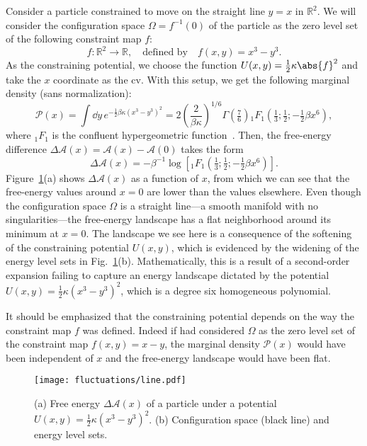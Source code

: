 Consider a particle constrained to move on the straight line $y = x$ in $\mathbb{R}^{2}$.
We will consider the configuration space $\Omega = f^{-1}(0)$ of the particle as the zero level set of the following constraint map $f$:
%
\begin{equation}
  f: \mathbb{R}^{2} \to \mathbb{R},
  \quad\text{defined by}\quad
  f(x, y) = x^{3} - y^{3}.
\end{equation}
%
As the constraining potential, we choose the function $U(x, y) = \tfrac{1}{2}\kappa\abs{f}^{2}$ and take the $x$ coordinate as the \ac{cv}.
With this setup, we get the following marginal density (sans normalization):
%
\begin{equation}
  \mathscr{P}(x) = \int \dd{y}\,e^{-\tfrac{1}{2}\beta\kappa (x^{3}-y^{3})^{2}}= 2\left(\frac{2}{\beta\kappa}\right)^{1/6}\Gamma\left(\tfrac{7}{6}\right){}_{1}\!F_{1}\left(\tfrac{1}{3};\tfrac{1}{2};-\tfrac{1}{2}\beta x^{6}\right),
\end{equation}
%
where ${}_{1}\!F_{1}$ is the confluent hypergeometric function~\cite{olver2010}.
Then, the free-energy difference $\Delta\mathscr{A}(x) = \mathscr{A}(x) - \mathscr{A}(0)$ takes the form
%
\begin{equation}
  \Delta\mathscr{A}(x) = -\beta^{-1}\log\left[{}_{1}\!F_{1}\left(\tfrac{1}{3};\tfrac{1}{2};-\tfrac{1}{2}\beta x^{6}\right)\right].
\end{equation}
%
Figure~\ref{fig:line}(a) shows $\Delta\mathscr{A}(x)$ as a function of $x$, from which we can see that the free-energy values around $x = 0$ are lower than the values elsewhere.
Even though the configuration space $\Omega$ is a straight line---a smooth manifold with no singularities---the free-energy landscape has a flat neighborhood around its minimum at $x = 0$.
The landscape we see here is a consequence of the softening of the constraining potential $U(x, y)$, which is evidenced by the widening of the energy level sets in Fig.~\ref{fig:line}(b).
Mathematically, this is a result of a second-order expansion failing to capture an energy landscape dictated by the potential $U(x, y) = \tfrac{1}{2}\kappa(x^{3}-y^{3})^{2}$, which is a degree six homogeneous polynomial.

It should be emphasized that the constraining potential depends on the way the constraint map $f$ was defined.
Indeed if had considered $\Omega$ as the zero level set of the constraint map $f(x, y) = x - y$, the marginal density $\mathscr{P}(x)$ would have been independent of $x$ and the free-energy landscape would have been flat.
%
\begin{figure}
  \begin{center}
    \texttt{[image: fluctuations/line.pdf]}
  \end{center}
  \caption{(a) Free energy $\Delta\mathscr{A}(x)$ of a particle under a potential $U(x,y) = \tfrac{1}{2}\kappa(x^{3}-y^{3})^{2}$. (b) Configuration space (black line) and energy level sets.}
  \label{fig:line}
\end{figure}

